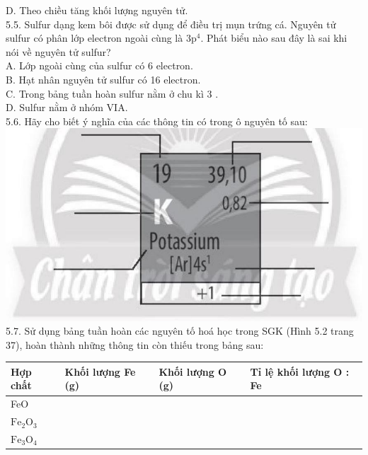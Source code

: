 \documentclass[10pt]{article}
\begin{document}
D. Theo chiều tăng khối lượng nguyên tử.\\
5.5. Sulfur dạng kem bôi được sử dụng để điều trị mụn trứng cá. Nguyên tử sulfur có phân lớp electron ngoài cùng là $3 \mathrm{p}^{4}$. Phát biểu nào sau đây là sai khi nói về nguyên tử sulfur?\\
A. Lớp ngoài cùng của sulfur có 6 electron.\\
B. Hạt nhân nguyên tử sulfur có 16 electron.\\
C. Trong bảng tuần hoàn sulfur nằm ở chu kì 3 .\\
D. Sulfur nằm ở nhóm VIA.\\
5.6. Hãy cho biết ý nghĩa của các thông tin có trong ô nguyên tố sau:\\
\includegraphics[max width=\textwidth, center]{2025_10_23_883c4b146e2332109fcdg-15}\\
5.7. Sử dụng bảng tuần hoàn các nguyên tố hoá học trong SGK (Hình 5.2 trang 37), hoàn thành những thông tin còn thiếu trong bảng sau:

\begin{center}
\begin{tabular}{|l|l|l|l|}
\hline
Hợp chất & Khối lượng Fe (g) & Khối lượng O (g) & Tỉ lệ khối lượng O : Fe \\
\hline
FeO &  &  &  \\
\hline
$\mathrm{Fe}_{2} \mathrm{O}_{3}$ &  &  &  \\
\hline
$\mathrm{Fe}_{3} \mathrm{O}_{4}$ &  &  &  \\
\hline
\end{tabular}
\end{center}
\end{document}
